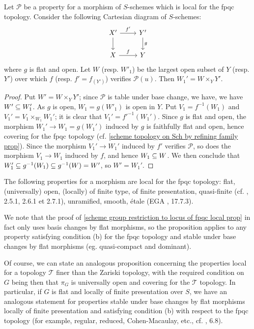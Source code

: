 \begin{lemma}\label{scheme locus of fpqc local prop stable under base change}
Let $\mathcal{P}$ be a property for a morphism of $S$-schemes which is local for the fpqc topology. Consider the following Cartesian diagram of $S$-schemes:
\[\begin{tikzcd}
X'\ar[d]\ar[r,"f'"]&Y'\ar[d,"g"]\\
X\ar[r,"f"]&Y
\end{tikzcd}\]
where $g$ is flat and open. Let $W$ (resp. $W'_1$) be the largest open subset of $Y$ (resp. $Y'$) over which $f$ (resp. $f'=f_{(Y')}$) verifies $\mathcal{P}(u)$. Then $W_1'=W\times_YY'$.
\end{lemma}
\begin{proof}
Put $W'=W\times_YY'$; since $\mathcal{P}$ is table under base change, we have, we have $W'\subseteq W'_1$. As $g$ is open, $W_1=g(W'_1)$ is open in $Y$. Put $V_1=f^{-1}(W_1)$ and $V_1'=V_1\times_{W_1}W_1'$; it is clear that $V_1'=f'^{-1}(W_1')$. Since $g$ is flat and open, the morphism $W_1'\to W_1=g(W_1')$ induced by $g$ is faithfully flat and open, hence covering for the fpqc topology (cf. \cref{scheme topology on Sch by refining family prop}). Since the morphism $V_1'\to W_1'$ induced by $f'$ verifies $\mathcal{P}$, so does the morphism $V_1\to W_1$ induced by $f$, and hence $W_1\subseteq W$. We then conclude that $W_1'\subseteq g^{-1}(W_1)\subseteq g^{-1}(W)=W'$, so $W'=W_1'$.
\end{proof}

\begin{example}
The following properties for a morphism are local for the fpqc topology: flat, (universally) open, (locally) of finite type, of finite presentation, quasi-finite (cf. \cite{EGA4-2}, 2.5.1, 2.6.1 et 2.7.1), unramified, smooth, \'etale (EGA \cite{EGA4-4}, 17.7.3).
\end{example}

\begin{remark}
We note that the proof of \cref{scheme group restriction to locus of fpqc local prop} in fact only uses basis changes by flat morphisms, so the proposition applies to any property satisfying condition (b) for the fpqc topology and stable under base changes by flat morphisms (eg. quasi-compact and dominant).\par
Of course, we can state an analogous proposition concerning the properties local for a topology $\mathcal{T}$ finer than the Zariski topology, with the required condition on $G$ being then that $\pi_G$ is universally open and covering for the $\mathcal{T}$ topology. In particular, if $G$ is flat and locally of finite presentation over $S$, we have an analogous statement for properties stable under base changes by flat morphisms locally of finite presentation and satisfying condition (b) with respect to the fpqc topology (for example, regular, reduced, Cohen-Macaulay, etc., cf. \cite{EGA4-2}, 6.8).
\end{remark}

